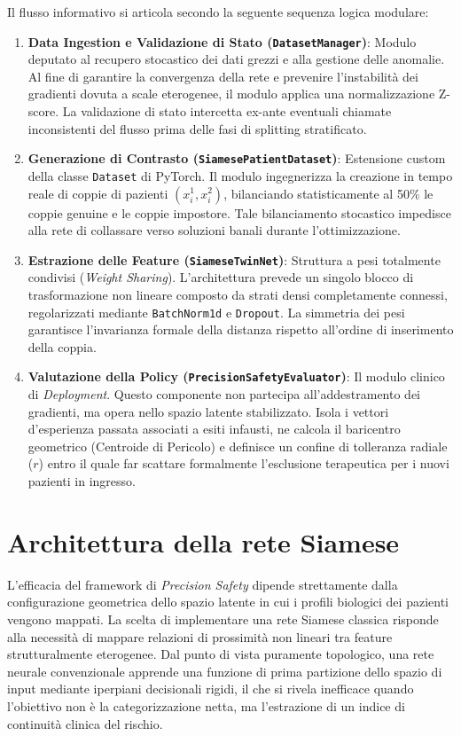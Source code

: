 \documentclass{article}
\begin{document}
Il flusso informativo si articola secondo la seguente sequenza logica modulare:
\begin{enumerate}
    \item \textbf{Data Ingestion e Validazione di Stato (\texttt{DatasetManager})}: Modulo deputato al recupero stocastico dei dati grezzi e alla gestione delle anomalie. Al fine di garantire la convergenza della rete e prevenire l'instabilità dei gradienti dovuta a scale eterogenee, il modulo applica una normalizzazione Z-score. La validazione di stato intercetta ex-ante eventuali chiamate inconsistenti del flusso prima delle fasi di splitting stratificato.
    \item \textbf{Generazione di Contrasto (\texttt{SiamesePatientDataset})}: Estensione custom della classe \texttt{Dataset} di PyTorch. Il modulo ingegnerizza la creazione in tempo reale di coppie di pazienti $(x_i^1, x_i^2)$, bilanciando statisticamente al 50\% le coppie genuine e le coppie impostore. Tale bilanciamento stocastico impedisce alla rete di collassare verso soluzioni banali durante l'ottimizzazione.
    \item \textbf{Estrazione delle Feature (\texttt{SiameseTwinNet})}: Struttura a pesi totalmente condivisi (\textit{Weight Sharing}). L'architettura prevede un singolo blocco di trasformazione non lineare composto da strati densi completamente connessi, regolarizzati mediante \texttt{BatchNorm1d} e \texttt{Dropout}. La simmetria dei pesi garantisce l'invarianza formale della distanza rispetto all'ordine di inserimento della coppia.
    \item \textbf{Valutazione della Policy (\texttt{PrecisionSafetyEvaluator})}: Il modulo clinico di \textit{Deployment}. Questo componente non partecipa all'addestramento dei gradienti, ma opera nello spazio latente stabilizzato. Isola i vettori d'esperienza passata associati a esiti infausti, ne calcola il baricentro geometrico (Centroide di Pericolo) e definisce un confine di tolleranza radiale ($r$) entro il quale far scattare formalmente l'esclusione terapeutica per i nuovi pazienti in ingresso.
\end{enumerate}

\section{Architettura della rete Siamese}
L'efficacia del framework di \textit{Precision Safety} dipende strettamente dalla configurazione geometrica dello spazio latente in cui i profili biologici dei pazienti vengono mappati. La scelta di implementare una rete Siamese classica risponde alla necessità di mappare relazioni di prossimità non lineari tra feature strutturalmente eterogenee. Dal punto di vista puramente topologico, una rete neurale convenzionale apprende una funzione di prima partizione dello spazio di input mediante iperpiani decisionali rigidi, il che si rivela inefficace quando l'obiettivo non è la categorizzazione netta, ma l'estrazione di un indice di continuità clinica del rischio.
\end{document}
